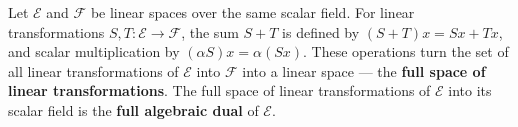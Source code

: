 Let $\mathcal{E}$ and $\mathcal{F}$ be linear spaces over the same scalar field. For linear transformations $S, T : \mathcal{E} \to \mathcal{F}$, the sum $S + T$ is defined by $(S + T)x = Sx + Tx$, and scalar multiplication by $(\alpha S)x = \alpha(Sx)$. These operations turn the set of all linear transformations of $\mathcal{E}$ into $\mathcal{F}$ into a linear space — the \textbf{full space of linear transformations}. The full space of linear transformations of $\mathcal{E}$ into its scalar field is the \textbf{full algebraic dual} of $\mathcal{E}$.
